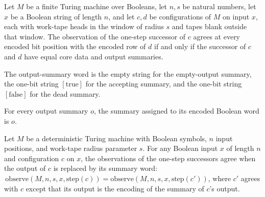 \begin{theorem}
\label{Complexity.codecObserve_step_iff}
\leanok
{}
Let $M$ be a finite Turing machine over Booleans, let $n,s$ be natural numbers, let $x$
be a Boolean string of length $n$, and let $c,d$ be configurations of $M$ on input $x$,
each with work-tape heads in the window of radius $s$ and tapes blank outside that
window. The observation of the one-step successor of $c$ agrees at every encoded bit
position with the encoded row of $d$ if and only if the successor of $c$ and $d$ have
equal core data and output summaries.
\end{theorem}

\begin{definition}
\label{Complexity.codecSummaryWord}
\leanok
{}
The output-summary word is the empty string for the empty-output summary, the one-bit
string $[\mathrm{true}]$ for the accepting summary, and the one-bit string
$[\mathrm{false}]$ for the dead summary.
\end{definition}

\begin{theorem}
\label{Complexity.codecSummaryWord_summary}
\leanok
{}
For every output summary $o$, the summary assigned to its encoded Boolean word is $o$.
\end{theorem}

\begin{theorem}
\label{Complexity.codecObserve_step_normalize}
\leanok
{}
Let $M$ be a deterministic Turing machine with Boolean symbols, $n$ input positions, and
work-tape radius parameter $s$. For any Boolean input $x$ of length $n$ and
configuration $c$ on $x$, the observations of the one-step successors agree when the
output of $c$ is replaced by its summary word:
$\,\mathrm{observe}(M,n,s,x,\mathrm{step}(c))=\mathrm{observe}(M,n,s,x,\mathrm{step}(c'))$,
where $c'$ agrees with $c$ except that its output is the encoding of the summary of
$c$’s output.
\end{theorem}

